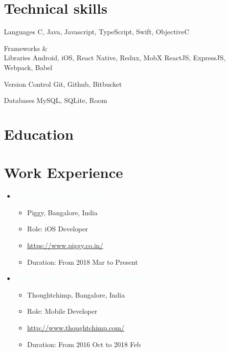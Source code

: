 \documentclass[11pt,a4paper]{moderncv}
\begin{document}
\maketitle

\section{Technical skills}

    \bigbreak    
    
    \cvcomputer
	{Languages}
           {C, Java, Javascript, TypeScript, Swift, ObjectiveC}{}{}
      
    \cvcomputer
	{Frameworks \&\\Libraries}
           {Android, iOS, React Native, Redux, MobX}
           {}{ReactJS, ExpressJS, Webpack, Babel}

    \cvcomputer
	 {Version Control}
           {Git, Github, Bitbucket}{}{}
    
    \cvcomputer
	 {Databases}
           {MySQL, SQLite, Room}{}{}

\section{Education}
    
    \bigbreak
    

\section{Work Experience}

     \bigbreak
    
     \begin{itemize}
	 \item {\textcolor{azure}{iOS and FrontEnd Developer}}
         \begin{itemize}
	     \item Piggy, Bangalore, India
	     \item Role: iOS Developer
	     \item {\url{https://www.piggy.co.in/}}
	     \item Duration: From 2018 Mar to Present
	 \end{itemize}
     \end{itemize}

     \bigbreak

     \begin{itemize}
        \item {\textcolor{azure}{Senior Android and React Native Developer}}
        \begin{itemize}
            \item Thoughtchimp, Bangalore, India
            \item Role: Mobile Developer
            \item {\url{http://www.thoughtchimp.com/}}
            \item Duration: From 2016 Oct to 2018 Feb 
        \end{itemize}
     \end{itemize}
\end{document}
